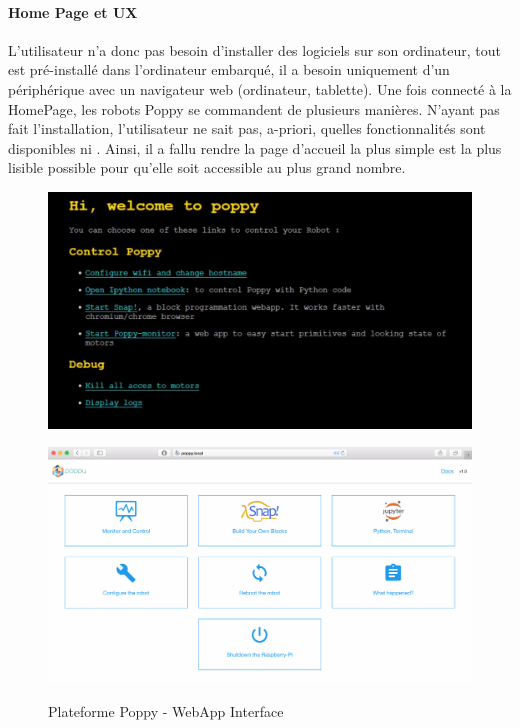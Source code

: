         \paragraph{Home Page et UX}
            L’utilisateur n'a donc pas besoin d’installer des logiciels sur son ordinateur, tout est pré-installé dans l’ordinateur embarqué, il a besoin uniquement d’un périphérique avec un navigateur web (ordinateur, tablette). Une fois connecté à la HomePage, les robots Poppy se commandent de plusieurs manières. N'ayant pas fait l'installation, l'utilisateur ne sait pas, a-priori, quelles fonctionnalités sont disponibles ni . Ainsi, il a fallu rendre la page d'accueil la plus simple est la plus lisible possible pour qu'elle soit accessible au plus grand nombre.
            \begin{figure}[!h]
            \centering
            \begin{minipage}{0.475\linewidth}
                \includegraphics[width=\linewidth]{Figures/poppy_webhome-old}\label{fig:webhome_0}
            \end{minipage}
            \hfill
            \begin{minipage}{0.475\linewidth}
                \includegraphics[width=\linewidth]{Figures/poppy_webhome}\label{fig:webhome_1}
            \end{minipage}
            \caption{Plateforme Poppy - WebApp Interface}
            \label{fig:webhome}
            \end{figure}\par%

